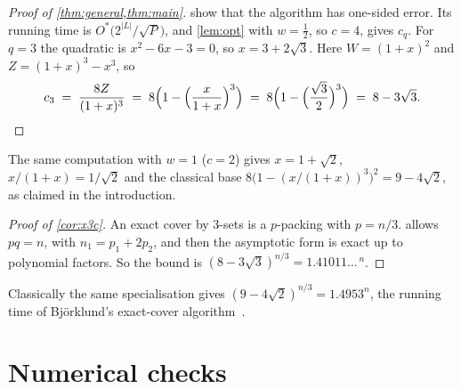 \documentclass[11pt,a4paper]{article}
\theoremstyle{plain}
\theoremstyle{remark}
\newcommand{\Ostar}{O^{*}}
\begin{document}
\begin{proof}[Proof of \cref{thm:general,thm:main}]
 show that the algorithm has one-sided error. Its running time is $\Ostar\big(2^{|L|}/\sqrt P\big)$, and \cref{lem:opt} with $w = \tfrac12$, so $c = 4$, gives $c_q$. For $q = 3$ the quadratic is $x^2 - 6x - 3 = 0$, so $x = 3 + 2\sqrt3$. Here $W = (1+x)^2$ and $Z = (1+x)^3 - x^3$, so
\[
  c_3 \;=\; \frac{8Z}{(1+x)^3} \;=\; 8\Big(1 - \Big(\frac{x}{1+x}\Big)^{3}\Big) \;=\; 8\Big(1 - \Big(\frac{\sqrt3}{2}\Big)^{3}\Big) \;=\; 8 - 3\sqrt3 . \qedhere
\]
\end{proof}

\noindent
The same computation with $w = 1$ ($c = 2$) gives $x = 1+\sqrt2$, $x/(1+x) = 1/\sqrt2$ and the classical base $8\big(1-(x/(1+x))^3\big)^2 = 9 - 4\sqrt2$, as claimed in the introduction.

\begin{proof}[Proof of \cref{cor:x3c}]
An exact cover by 3-sets is a $p$-packing with $p = n/3$.  allows $pq = n$, with $n_1 = p_1 + 2p_2$, and then the asymptotic form is exact up to polynomial factors. So the bound is $(8-3\sqrt3)^{n/3} = 1.41011\ldots^{\,n}$.
\end{proof}

\noindent
Classically the same specialisation gives $(9-4\sqrt2)^{n/3} = 1.4953^n$, the running time of Björklund's exact-cover algorithm~\cite{bjorklundec,bhkk}.

\section{Numerical checks}\label{sec:numerics}
\end{document}
